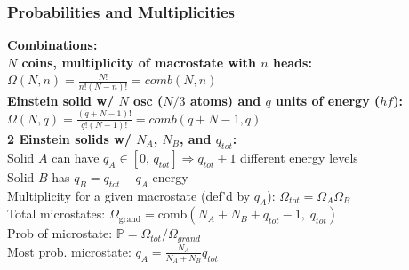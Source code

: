 \documentclass[letterpaper,landscape,10pt]{article}
\begin{document}
{\begin{multicols}{4}
  \subsubsection*{Probabilities and Multiplicities} 
  \textbf{Combinations:} \\
  \textbf{$N$ coins, multiplicity of macrostate with $n$ heads:}\\
	\hspace{5pt}$\Omega(N,n)=\frac{N!}{n!(N-n)!}= comb(N,n)$ \\
	\textbf{Einstein solid w/ $N$ osc ($N/3$ atoms) and $q$ units of energy ($hf$):} \\
	\hspace{5pt} $\Omega(N,q)=\frac{(q+N-1)!}{q!(N-1)!} = comb(q+N-1, q)$ \\
	\textbf{2 Einstein solids w/ $N_A$, $N_B$, and $q_{tot}$:} \\
	\hspace{5pt} Solid $A$ can have $q_A \in [0,\,q_{tot}]\Longrightarrow q_{tot}+1$ different energy levels \\
	\hspace{5pt} Solid $B$ has $q_B=q_{tot}-q_A$ energy \\
	\hspace{5pt} Multiplicity for a given macrostate (def'd by $q_A$): $\Omega_{tot} = \Omega_A \Omega_B$ \\
	\hspace{5pt} Total microstates: $\Omega_{\textrm{grand}}=\textrm{comb}(N_A+N_B+q_{tot}-1,\;q_{tot})$ \\
	\hspace{5pt} Prob of microstate: $\mathbb{P} = \Omega_{tot}/\Omega_{grand}$ \\
	\hspace{5pt} Most prob. microstate: ${q_A} = \frac{N_A}{N_A+N_B}q_{tot}$ \\


\end{multicols}}
\end{document}
